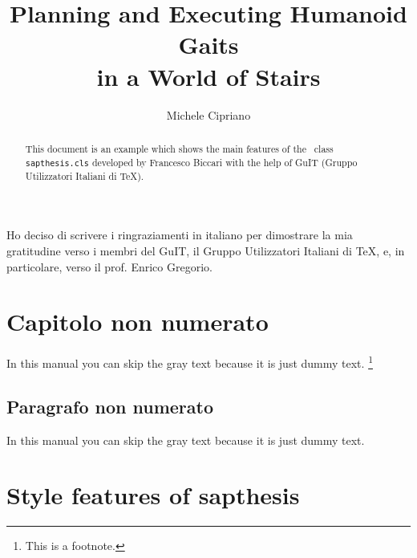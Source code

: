 \documentclass[LaM,binding=0.6cm]{sapthesis}
\title{Planning and Executing Humanoid Gaits\\in a World of Stairs}
\author{Michele Cipriano}
\begin{document}
\frontmatter

\maketitle

\dedication{Dedicated to\\ Donald Knuth}

\begin{abstract}
This document is an example which shows the main features of
the \LaTeXe\ class \texttt{sapthesis.cls} developed by Francesco Biccari
with the help of GuIT (Gruppo Utilizzatori Italiani di \TeX).
\end{abstract}

\begin{acknowledgments}
Ho deciso di scrivere i ringraziamenti in italiano
per dimostrare la mia gratitudine verso i membri
del GuIT, il Gruppo Utilizzatori Italiani di \TeX, e, in particolare,
verso il prof. Enrico Gregorio.
\end{acknowledgments}

\tableofcontents

\chapter{Capitolo non numerato}

In this manual you can skip the gray text because it is just dummy text.%
\footnote{This is a footnote.}

\textcolor{gray}{\lipsum[1-22]}


\section*{Paragrafo non numerato}

In this manual you can skip the gray text because it is just dummy text.

\textcolor{gray}{\lipsum[1-22]}




\mainmatter








\chapter{Style features of \textsf{sapthesis}}
\end{document}
